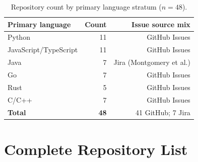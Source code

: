 \begin{table}[htbp]
\centering
\caption{Repository count by primary language stratum ($n = 48$).}
\label{tab:app-repo-strata}
\begin{tabular}{lrr}
\toprule
\textbf{Primary language} & \textbf{Count} & \textbf{Issue source mix} \\
\midrule
Python        & 11 & GitHub Issues \\
JavaScript/TypeScript & 11 & GitHub Issues \\
Java          &  7 & Jira (Montgomery et al.) \\
Go            &  7 & GitHub Issues \\
Rust          &  5 & GitHub Issues \\
C/C++         &  7 & GitHub Issues \\
\midrule
\textbf{Total} & \textbf{48} & 41 GitHub; 7 Jira \\
\bottomrule
\end{tabular}
\end{table}


\section{Complete Repository List}
\label{app:repo-table}

